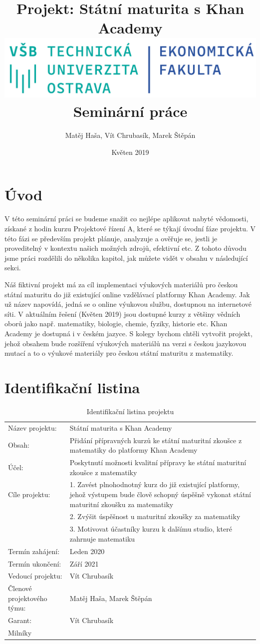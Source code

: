 \documentclass[12pt, a4paper]{report}
\author{Matěj Haša, Vít Chrubasík, Marek Štěpán}
\date{Květen 2019}
\title{Projekt: Státní maturita s Khan Academy\\\medskip
\large \includegraphics[width=\linewidth]{./images/skola_logo.png} Seminární práce}
\begin{document}
\maketitle
\tableofcontents
\thispagestyle{empty}



\chapter{Úvod}
\label{sec:org4be1668}
V této seminární práci se budeme snažit co nejlépe aplikovat nabyté vědomosti, získané z hodin kurzu Projektové řízení A, které se týkají úvodní fáze projektu. V této fázi se především projekt plánuje, analyzuje a ověřuje se, jestli je proveditelný v kontextu našich možných zdrojů, efektivní etc. Z tohoto důvodu jsme práci rozdělili do několika kapitol, jak můžete vidět v obsahu v následující sekci. 

Náš fiktivní projekt má za cíl implementaci výukových materiálů pro českou státní maturitu do již existující online vzdělávací platformy Khan Academy. Jak už název napovídá, jedná se o online výukovou službu, dostupnou na internetové síti. V aktuálním řešení (Květen 2019) jsou dostupné kurzy z většiny vědních oborů jako např. matematiky, biologie, chemie, fyziky, historie etc. Khan Academy je dostupná i v českém jazyce. S kolegy bychom chtěli vytvořit projekt, jehož obsahem bude rozšíření výukových materiálů na verzi s českou jazykovou mutací a to o výukové materiály pro českou státní maturitu z matematiky.
\chapter{Identifikační listina}
\label{sec:org35d7906}

\begin{table}[htbp]
\caption{Identifikační listina projektu}
\centering
\begin{tabularx}{\textwidth}{XX}
Název projektu: & Státní maturita s Khan Academy\\
Obsah: & Přidání přípravných kurzů ke státní maturitní zkoušce z matematiky do platformy Khan Academy\\
Účel: & Poskytnutí možnosti kvalitní přípravy ke státní maturitní zkoušce z matematiky\\
Cíle projektu: & 1. Zavést plnohodnotný kurz do již existující platformy, jehož výstupem bude člově schopný úspěšně vykonat státní maturitní zkoušku za matematiky\\
 & 2. Zvýšit úspěšnost u maturitní zkoušky za matematiky\\
 & 3. Motivovat účastníky kurzu k dalšímu studio, které zahrnuje matematiku\\
Termín zahájení: & Leden 2020\\
Termín ukončení: & Září 2021\\
Vedoucí projektu: & Vít Chrubasík\\
Členové projektového týmu: & Matěj Haša, Marek Štěpán\\
Garant: & Vít Chrubasík\\
Milníky & \\
\end{tabularx}
\end{table}
\end{document}
